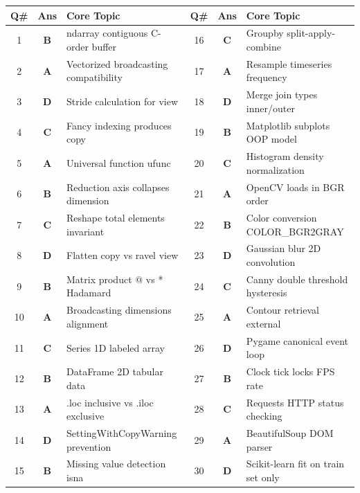 \begin{center}
\begin{tabularx}{0.96\textwidth}{c c X c c X}
\toprule
\textbf{Q\#} & \textbf{Ans} & \textbf{Core Topic} & \textbf{Q\#} & \textbf{Ans} & \textbf{Core Topic} \\
\midrule
1 & \textbf{B} & ndarray contiguous C-order buffer & 16 & \textbf{C} & Groupby split-apply-combine \\
2 & \textbf{A} & Vectorized broadcasting compatibility & 17 & \textbf{A} & Resample timeseries frequency \\
3 & \textbf{D} & Stride calculation for view & 18 & \textbf{D} & Merge join types inner/outer \\
4 & \textbf{C} & Fancy indexing produces copy & 19 & \textbf{B} & Matplotlib subplots OOP model \\
5 & \textbf{A} & Universal function ufunc & 20 & \textbf{C} & Histogram density normalization \\
6 & \textbf{B} & Reduction axis collapses dimension & 21 & \textbf{A} & OpenCV loads in BGR order \\
7 & \textbf{C} & Reshape total elements invariant & 22 & \textbf{B} & Color conversion COLOR\_BGR2GRAY \\
8 & \textbf{D} & Flatten copy vs ravel view & 23 & \textbf{D} & Gaussian blur 2D convolution \\
9 & \textbf{B} & Matrix product @ vs * Hadamard & 24 & \textbf{C} & Canny double threshold hysteresis \\
10 & \textbf{A} & Broadcasting dimensions alignment & 25 & \textbf{A} & Contour retrieval external \\
11 & \textbf{C} & Series 1D labeled array & 26 & \textbf{D} & Pygame canonical event loop \\
12 & \textbf{B} & DataFrame 2D tabular data & 27 & \textbf{B} & Clock tick locks FPS rate \\
13 & \textbf{A} & .loc inclusive vs .iloc exclusive & 28 & \textbf{C} & Requests HTTP status checking \\
14 & \textbf{D} & SettingWithCopyWarning prevention & 29 & \textbf{A} & BeautifulSoup DOM parser \\
15 & \textbf{B} & Missing value detection isna & 30 & \textbf{D} & Scikit-learn fit on train set only \\
\bottomrule
\end{tabularx}
\end{center}
\vspace{{4mm}}


